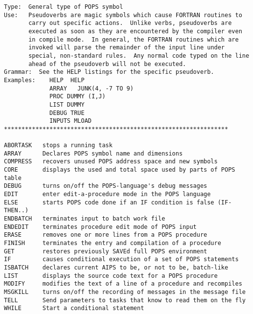 \vfill\eject
{}

\vskip 0.5pt
\bbve\begin{verbatim}
Type:  General type of POPS symbol
Use:   Pseudoverbs are magic symbols which cause FORTRAN routines to
       carry out specific actions.  Unlike verbs, pseudoverbs are
       executed as soon as they are encountered by the compiler even
       in compile mode.  In general, the FORTRAN routines which are
       invoked will parse the remainder of the input line under
       special, non-standard rules.  Any normal code typed on the line
       ahead of the pseudoverb will not be executed.
Grammar:  See the HELP listings for the specific pseudoverb.
Examples:    HELP  HELP
             ARRAY   JUNK(4, -7 TO 9)
             PROC DUMMY (I,J)
             LIST DUMMY
             DEBUG TRUE
             INPUTS MLOAD
****************************************************************

ABORTASK   stops a running task
ARRAY      Declares POPS symbol name and dimensions
COMPRESS   recovers unused POPS address space and new symbols
CORE       displays the used and total space used by parts of POPS table
DEBUG      turns on/off the POPS-language's debug messages
EDIT       enter edit-a-procedure mode in the POPS language
ELSE       starts POPS code done if an IF condition is false (IF-THEN..)
ENDBATCH   terminates input to batch work file
ENDEDIT    terminates procedure edit mode of POPS input
ERASE      removes one or more lines from a POPS procedure
FINISH     terminates the entry and compilation of a procedure
GET        restores previously SAVEd full POPS environment
IF         causes conditional execution of a set of POPS statements
ISBATCH    declares current AIPS to be, or not to be, batch-like
LIST       displays the source code text for a POPS procedure
MODIFY     modifies the text of a line of a procedure and recompiles
MSGKILL    turns on/off the recording of messages in the message file
TELL       Send parameters to tasks that know to read them on the fly
WHILE      Start a conditional statement
\end{verbatim}\eve


